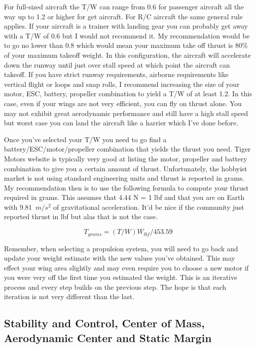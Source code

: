 \documentclass{article}
\begin{document}
For full-sized aircraft the T/W can range from 0.6 for passenger
aircraft all the way up to 1.2 or higher for get aircraft. For R/C
aircraft the same general rule applies. If your aircraft is a trainer
with landing gear you can probably get away with a T/W of 0.6 but I
would not recommend it. My recommendation would be to go no lower than
0.8 which would mean your maximum take off thrust is 80\% of your
maximum takeoff weight. In this configuration, the aircraft will
accelerate down the runway until just over stall speed at which point
the aircraft can takeoff. If you have strict runway requirements,
airborne requirements like vertical flight or loops and snap rolls, I
recommend increasing the size of your motor, ESC, battery, propeller
combination to yield a T/W of at least 1.2. In this case, even if your
wings are not very efficient, you can fly on thrust alone. You may not
exhibit great aerodynamic performance and still have a high stall
speed but worst case you can land the aircraft like a harrier which
I've done before.

Once you've selected your T/W you need to go find a
battery/ESC/motor/propeller combination that yields the thrust you
need. Tiger Motors website is typically very good at listing the
motor, propeller and battery combination to give you a certain amount
of thrust. Unfortunately, the hobbyist market is not using standard
engineering units and thrust is reported in grams. My recommendation
then is to use the following formula to compute your thrust required
in grams. This assumes that 4.44 N = 1 lbf and that you are on Earth
with 9.81~$m/s^2$ of gravitational acceleration. It'd be nice if the
community just reported thrust in lbf but alas that is not the case. 

\begin{equation}
T_{grams} = (T/W)W_{lbf}/453.59
\end{equation}

Remember, when selecting a propulsion system, you will need to go back
and update your weight estimate with the new values you've
obtained. This may effect your wing area slightly and may even require
you to choose a new motor if you were very off the first time you
estimated the weight. This is an iterative process and every step
builds on the previous step. The hope is that each iteration is not
very different than the last. 

\subsection{Stability and Control, Center of Mass, Aerodynamic Center and Static Margin}
\end{document}
